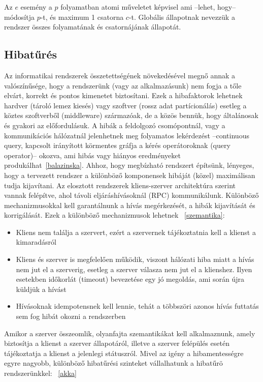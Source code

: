 \documentclass[a4paper,12pt]{article}
\begin{document}
Az $e$ esemény a $p$ folyamatban atomi műveletet képvisel ami --lehet, hogy-- módosítja $p$-t, és maximum 1 csatorna $c$-t. Globális állapotnak nevezzük a rendszer összes folyamatának és csatornájának állapotát. \linebreak


\subsection{Hibatűrés}

Az informatikai rendszerek összetettségének növekedésével megnő annak a valószínűsége, hogy a rendszerünk (vagy az alkalmazásunk) nem fogja a tőle elvárt, korrekt és pontos kimenetet biztosítani. Ezek a hibafaktorok lehetnek hardver (tároló lemez kiesés) vagy szoftver (rossz adat partícionálás) esetleg a köztes szoftverből (middleware) származóak, de a közös bennük, hogy általánosak és gyakori az előfordulásuk.  A hibák a feldolgozó csomópontnál, vagy a kommunikációs hálózatnál jelenhetnek meg folyamatos lekérdezést --continuous query, kapcsolt irányított körmentes gráfja a kérés operátoroknak (query operator)-- okozva, ami hibás vagy hiányos eredményeket produkálhat~\ref{balazinska}. Ahhoz, hogy megbízható rendszert építsünk, lényeges, hogy a tervezett rendszer a különböző komponensek hibáját (közel) maximálisan tudja kijavítani. Az elosztott rendszerek kliens-szerver architektúra szerint vannak felépítve, ahol távoli eljáráshívásoknál (RPC) kommunikálunk. Különböző mechanizmusokkal kell garantálnunk a hívás megérkezését, a hibák kijavítását és korrigálását. Ezek a különböző mechanizmusok lehetnek ~\ref{szemantika}:

\begin{itemize}
\item Kliens nem találja a szervert, ezért a szervernek tájékoztatnia kell a klienst a kimaradásról
\item Kliens és szerver is megfelelően működik, viszont hálózati hiba miatt a hívás nem jut el a szerverig, esetleg a szerver válasza nem jut el a klienshez. Ilyen esetekben időkorlát (timeout) bevezetése egy jó megoldás, ami során újra küldjük a hívást
\item Hívásoknak idempotensnek kell lennie, tehát a többszöri azonos hívás futtatás sem fog hibát okozni a rendszerben
\end{itemize}

Amikor a szerver összeomlik, olyanfajta szemantikákat kell alkalmaznunk, amely biztosítja a klienst a szerver állapotáról, illetve a szerver felépülés esetén tájékoztatja a klienst a jelenlegi státuszról. \linebreak
Mivel az igény a hibamentességre egyre nagyobb, különböző hibatűrési szinteket vállalhatunk a hibatűrö rendszerünkkel: ~\ref{akka}
\end{document}
